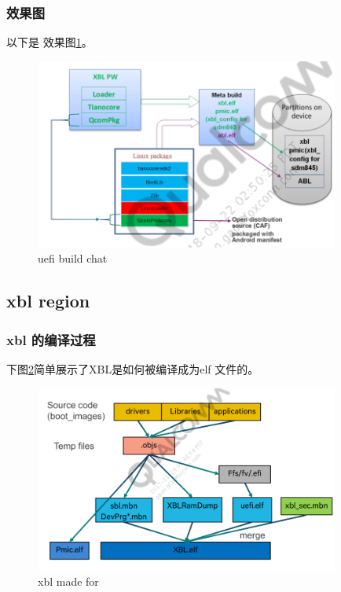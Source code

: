 \subsubsection{效果图}
以下是 效果图\ref{howxblmade}。
\begin{figure}[htbp]
\begin{center}
\includegraphics[width=10cm]{img/uefimeta}
\caption{uefi build chat}
\label{howxblmade}
\end{center}
\vspace{-0.5em}
\end{figure}


\subsection{xbl region}

\subsubsection{ xbl 的编译过程 }
下图\ref{madexbl}简单展示了XBL是如何被编译成为elf 文件的。

\begin{figure}[htbp]
\begin{center}
\includegraphics[width=10cm]{img/madexbl}
\caption{xbl made for}
\label{madexbl}
\end{center}
\vspace{-0.5em}
\end{figure}


